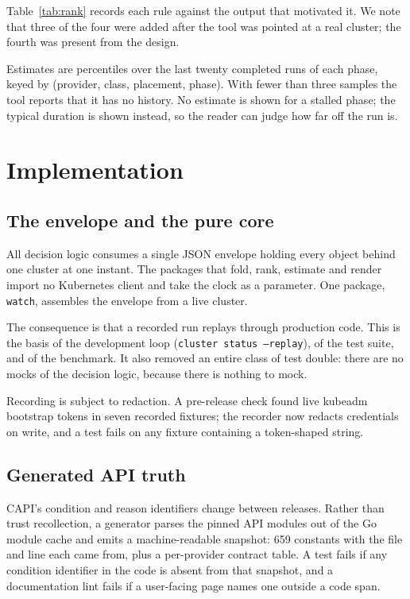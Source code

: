 \documentclass[conference]{IEEEtran}
\begin{document}
Table~\ref{tab:rank} records each rule against the output that motivated it. We
note that three of the four were added after the tool was pointed at a real
cluster; the fourth was present from the design.

Estimates are percentiles over the last twenty completed runs of each phase, keyed
by (provider, class, placement, phase). With fewer than three samples the tool
reports that it has no history. No estimate is shown for a stalled phase; the
typical duration is shown instead, so the reader can judge how far off the run is.

\section{Implementation}

\subsection{The envelope and the pure core}
\label{sec:envelope}

All decision logic consumes a single JSON envelope holding every object behind one
cluster at one instant. The packages that fold, rank, estimate and render import
no Kubernetes client and take the clock as a parameter. One package,
\texttt{watch}, assembles the envelope from a live cluster.

The consequence is that a recorded run replays through production code. This is
the basis of the development loop (\texttt{cluster status --replay}), of the test
suite, and of the benchmark. It also removed an entire class of test double: there
are no mocks of the decision logic, because there is nothing to mock.

Recording is subject to redaction. A pre-release check found live kubeadm
bootstrap tokens in seven recorded fixtures; the recorder now redacts credentials
on write, and a test fails on any fixture containing a token-shaped string.

\subsection{Generated API truth}

CAPI's condition and reason identifiers change between releases. Rather than trust
recollection, a generator parses the pinned API modules out of the Go module cache
and emits a machine-readable snapshot: 659 constants with the file and line each
came from, plus a per-provider contract table. A test fails if any condition
identifier in the code is absent from that snapshot, and a documentation lint
fails if a user-facing page names one outside a code span.
\end{document}
